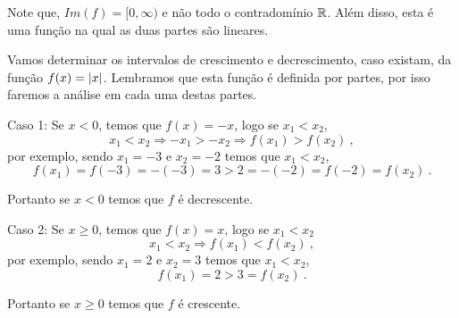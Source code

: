 Note que, $Im(f)= [0, \infty)$ e não todo o contradomínio $\mathbb{R}$. Além disso, esta é uma função na qual as duas partes são lineares.
  
 \begin{exem}
 Vamos determinar os intervalos de crescimento e decrescimento, caso existam, da função $f(x)= \left|x\right|$. Lembramos que esta função é definida por partes, por isso faremos a análise em cada uma destas partes.

  Caso 1: Se $x < 0$, temos que $f(x)= -x$, logo se $x_1 < x_2$,
\begin{equation*}
x_1 < x_2 \Rightarrow -x_1 > -x_2 \Rightarrow f(x_1) > f(x_2) \ ,
\end{equation*}
  por exemplo, sendo $x_1= -3$ e $x_2= -2$ temos que $x_1 < x_2$,
\begin{equation*}
f(x_1)= f(-3)= -(-3)= 3 > 2= -(-2)= f(-2)= f(x_2) \ .
\end{equation*}

  Portanto se $x < 0$ temos que $f$ é decrescente.

  Caso 2: Se $x \geq 0$, temos que $f(x)= x$, logo se $x_1 < x_2$
\begin{equation*}
x_1 < x_2 \Rightarrow  f(x_1) < f(x_2) \ ,
\end{equation*}
  por exemplo, sendo $x_1= 2$ e $x_2= 3$ temos que $x_1 < x_2$,
\begin{equation*}
f(x_1)= 2 > 3= f(x_2) \ .
\end{equation*}

  Portanto se $x \geq 0$ temos que $f$ é crescente.
 \end{exem}

